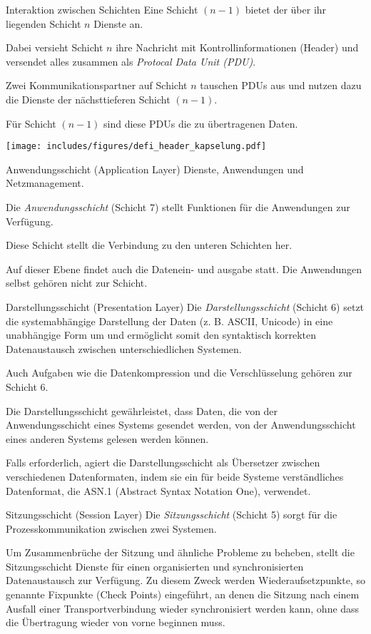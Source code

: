 \begin{defi}{Interaktion zwischen Schichten}
    Eine Schicht $(n-1)$ bietet der über ihr liegenden Schicht $n$ Dienste an.

    Dabei versieht Schicht $n$ ihre Nachricht mit Kontrollinformationen (Header) und versendet alles zusammen als \emph{Protocal Data Unit (PDU)}.

    Zwei Kommunikationspartner auf Schicht $n$ tauschen PDUs aus und nutzen dazu die Dienste der nächsttieferen Schicht $(n-1)$.

    Für Schicht $(n-1)$ sind diese PDUs die zu übertragenen Daten.

    \centering
    \texttt{[image: includes/figures/defi\_header\_kapselung.pdf]}
\end{defi}

\begin{defi}{Anwendungsschicht (Application Layer)}
    Dienste, Anwendungen und Netzmanagement.

    Die \emph{Anwendungsschicht} (Schicht 7) stellt Funktionen für die Anwendungen zur Verfügung.

    Diese Schicht stellt die Verbindung zu den unteren Schichten her.

    Auf dieser Ebene findet auch die Datenein- und ausgabe statt.
    Die Anwendungen selbst gehören nicht zur Schicht.
\end{defi}

\begin{defi}{Darstellungsschicht (Presentation Layer)}
    Die \emph{Darstellungsschicht} (Schicht 6) setzt die systemabhängige Darstellung der Daten (z. B. ASCII, Unicode) in eine unabhängige Form um und ermöglicht somit den syntaktisch korrekten Datenaustausch zwischen unterschiedlichen Systemen.

    Auch Aufgaben wie die Datenkompression und die Verschlüsselung gehören zur Schicht 6.

    Die Darstellungsschicht gewährleistet, dass Daten, die von der Anwendungsschicht eines Systems gesendet werden, von der Anwendungsschicht eines anderen Systems gelesen werden können.

    Falls erforderlich, agiert die Darstellungsschicht als Übersetzer zwischen verschiedenen Datenformaten, indem sie ein für beide Systeme verständliches Datenformat, die ASN.1 (Abstract Syntax Notation One), verwendet.
\end{defi}

\begin{defi}{Sitzungsschicht (Session Layer)}
    Die \emph{Sitzungsschicht} (Schicht 5) sorgt für die Prozesskommunikation zwischen zwei Systemen.

    Um Zusammenbrüche der Sitzung und ähnliche Probleme zu beheben, stellt die Sitzungsschicht Dienste für einen organisierten und synchronisierten Datenaustausch zur Verfügung.
    Zu diesem Zweck werden Wiederaufsetzpunkte, so genannte Fixpunkte (Check Points) eingeführt, an denen die Sitzung nach einem Ausfall einer Transportverbindung wieder synchronisiert werden kann, ohne dass die Übertragung wieder von vorne beginnen muss.
\end{defi}

